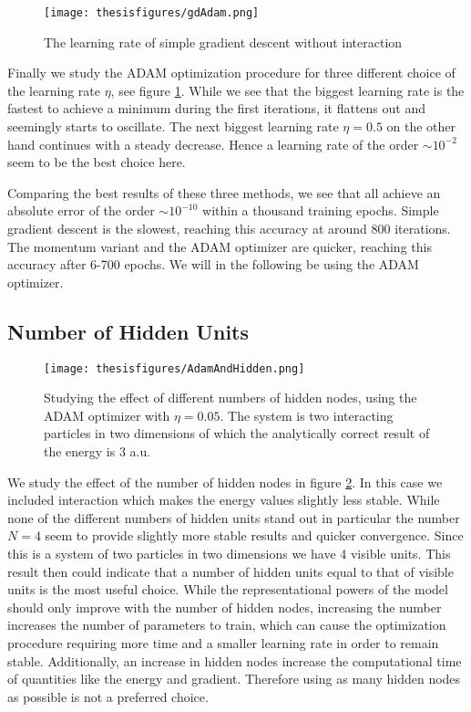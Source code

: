 \documentclass[twoside,english]{uiofysmaster}
\begin{document}
\begin{figure}
\centering
 \texttt{[image: thesisfigures/gdAdam.png]}
 \caption{The learning rate of simple gradient descent without interaction}
 \label{fig:gdAdam}
\end{figure}

Finally we study the ADAM optimization procedure for three different choice of the learning rate $\eta$, see figure \ref{fig:gdAdam}. While we see that the biggest learning rate is the fastest to achieve a minimum during the first iterations, it flattens out and seemingly starts to oscillate. The next biggest learning rate $\eta=0.5$ on the other hand continues with a steady decrease. Hence a learning rate of the order $\sim 10^{-2}$ seem to be the best choice here.

Comparing the best results of these three methods, we see that all achieve an absolute error of the order $\sim 10^{-10}$ within a thousand training epochs. Simple gradient descent is the slowest, reaching this accuracy at around 800 iterations. The momentum variant and the ADAM optimizer are quicker, reaching this accuracy after 6-700 epochs. We will in the following be using the ADAM optimizer.


\subsection{Number of Hidden Units}



\begin{figure}
\centering
 \texttt{[image: thesisfigures/AdamAndHidden.png]}
 \caption{Studying the effect of different numbers of hidden nodes, using the ADAM optimizer with $\eta=0.05$. The system is two interacting particles in two dimensions of which the analytically correct result of the energy is 3 a.u.}
 \label{fig:AdamAndHidden}
\end{figure}

We study the effect of the number of hidden nodes in figure \ref{fig:AdamAndHidden}. In this case we included interaction which makes the energy values slightly less stable. While none of the different numbers of hidden units stand out in particular the number $N=4$ seem to provide slightly more stable results and quicker convergence. Since this is a system of two particles in two dimensions we have 4 visible units. This result then could indicate that a number of hidden units equal to that of visible units is the most useful choice. While the representational powers of the model should only improve with the number of hidden nodes, increasing the number increases the number of parameters to train, which can cause the optimization procedure requiring more time and a smaller learning rate in order to remain stable. Additionally, an increase in hidden nodes increase the computational time of quantities like the energy and gradient. Therefore using as many hidden nodes as possible is not a preferred choice.
\end{document}
